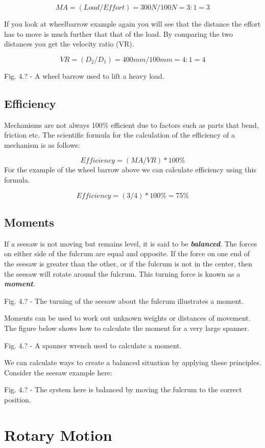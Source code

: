 \documentclass[
]{book}
\begin{document}
\[MA=(Load/Effort)=300N/100N=3:1 = 3\]

If you look at wheelbarrow example again you will see that the distance the effort has to move is much further that that of the load. By comparing the two distances you get the velocity ratio (VR).

\[VR=(D_2/D_1)=400mm/100mm=4:1=4\]

Fig. 4.? - A wheel barrow used to lift a heavy load.

\hypertarget{efficiency}{%
\subsection{Efficiency}\label{efficiency}}

Mechanisms are not always 100\% efficient due to factors such as parts that bend, friction etc.
The scientific formula for the calculation of the efficiency of a mechanism is as follows:

\[Efficiency = (MA/VR)*100\%\]
For the example of the wheel barrow above we can calculate efficiency using this formula.

\[Efficiency=(3/4)*100\%=75\%\]

\hypertarget{moments}{%
\subsection{Moments}\label{moments}}

If a seesaw is not moving but remains level, it is said to be \textbf{\emph{balanced}}. The forces on either side of the fulcrum are equal and opposite. If the force on one end of the seesaw is greater than the other, or if the fulcrum is not in the center, then the seesaw will rotate around the fulcrum. This turning force is known as a \textbf{\emph{moment}}.

Fig. 4.? - The turning of the seesaw about the fulcrum illustrates a moment.

Moments can be used to work out unknown weights or distances of movement. The figure below shows how to calculate the moment for a very large spanner.

Fig. 4.? - A spanner wrench used to calculate a moment.

We can calculate ways to create a balanced situation by applying these principles. Consider the seesaw example here:

Fig. 4.? - The system here is balanced by moving the fulcrum to the correct position.

\hypertarget{rotary-motion}{%
\section{Rotary Motion}\label{rotary-motion}}
\end{document}
